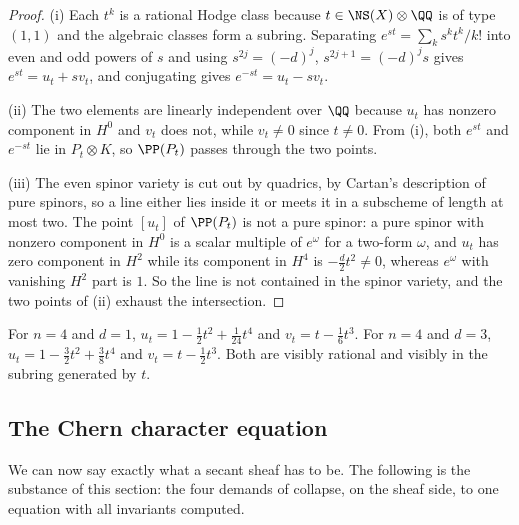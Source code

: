 \begin{proof}
(i) Each $t^{k}$ is a rational Hodge class because $t\in\NS(X)\otimes\QQ$ is
of type $(1,1)$ and the algebraic classes form a subring. Separating
$e^{st}=\sum_{k}s^{k}t^{k}/k!$ into even and odd powers of $s$ and using
$s^{2j}=(-d)^{j}$, $s^{2j+1}=(-d)^{j}s$ gives $e^{st}=u_{t}+sv_{t}$, and
conjugating gives $e^{-st}=u_{t}-sv_{t}$.

(ii) The two elements are linearly independent over $\QQ$ because $u_{t}$ has
nonzero component in $H^{0}$ and $v_{t}$ does not, while $v_{t}\ne0$ since
$t\ne0$. From (i), both $e^{st}$ and $e^{-st}$ lie in $P_{t}\otimes K$, so
$\PP(P_{t})$ passes through the two points.

(iii) The even spinor variety is cut out by quadrics, by Cartan's description
of pure spinors, so a line either lies inside it or meets it in a subscheme of
length at most two. The point $[u_{t}]$ of $\PP(P_{t})$ is not a pure spinor:
a pure spinor with nonzero component in $H^{0}$ is a scalar multiple of
$e^{\omega}$ for a two-form $\omega$, and $u_{t}$ has zero component in
$H^{2}$ while its component in $H^{4}$ is $-\tfrac{d}{2}t^{2}\ne0$, whereas
$e^{\omega}$ with vanishing $H^{2}$ part is $1$. So the line is not contained
in the spinor variety, and the two points of (ii) exhaust the intersection.
\end{proof}

\begin{example}\label{ex:planes}
For $n=4$ and $d=1$,
$u_{t}=1-\tfrac{1}{2}t^{2}+\tfrac{1}{24}t^{4}$ and
$v_{t}=t-\tfrac{1}{6}t^{3}$. For $n=4$ and $d=3$,
$u_{t}=1-\tfrac{3}{2}t^{2}+\tfrac{3}{8}t^{4}$ and
$v_{t}=t-\tfrac{1}{2}t^{3}$. Both are visibly rational and visibly in the
subring generated by $t$.
\end{example}

\subsection{The Chern character equation}

We can now say exactly what a secant sheaf has to be. The following is the
substance of this section: the four demands of  collapse, on
the sheaf side, to one equation with all invariants computed.

